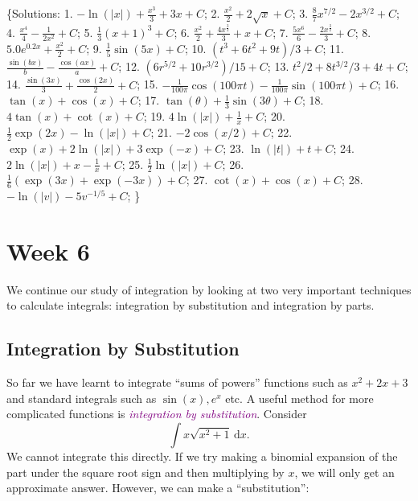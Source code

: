 \documentclass[
  english,
  11pt,
  oneside]{book}
\newcommand{\slide}{}
\theoremstyle{definition}
\theoremstyle{definition}
\theoremstyle{definition}
\theoremstyle{definition}
\theoremstyle{remark}
\begin{document}
\{Solutions:
1. \(-\ln(|x|)+{\frac{x^3}{3}}+3x+C\);
2. \({\frac{x^2}{2}}+2\sqrt{x}+C\);
3. \(\frac{8}{7}x^{7/2} - 2x^{3/2}+C\);
4. \({\frac{x^4}{4}}-{\frac{1}{2x^2}}+C\);
5. \(\frac{1}{3}(x+1)^3+C\);
6. \({\frac{x^2}{2}}+\frac{4x^{\frac{3}{2}}}{3}+x+C\);
7. \({\frac{5x^6}{6}}-\frac{2x^{\frac{3}{2}}}{3}+C\);
8. \(5.0e^{0.2x}+\frac{x^2}{2}+C\);
9. \(\frac{1}{5}\sin(5x)+C\);
10. \((t^3+6t^2+9t)/3+C\);
11. \(\frac{\sin(bx)}{b}-\frac{\cos(ax)}{a}+C\);
12. \((6r^{5/2}+10r^{3/2})/15+C\);
13. \(t^2/2 + 8t^{3/2}/3+4t+C\);
14. \(\frac{\sin(3x)}{3}+\frac{\cos(2x)}{2}+C\);
15. \(-\frac{1}{100\pi}\cos(100\pi t) - \frac{1}{100\pi}\sin(100\pi t) + C\);
16. \(\tan(x)+\cos(x)+C\);
17. \(\tan(\theta) + \frac{1}{3}\sin(3\theta)+C\);
18. \(4\tan(x) + \cot(x) +C\);
19. \(4\ln(|x|) + \frac{1}{x} +C\);
20. \(\frac{1}{2}\exp(2x)-\ln(|x|) + C\);
21. \(-2\cos(x/2)+C\);
22. \(\exp(x) + 2\ln(|x|) +3\exp(-x)+C\);
23. \(\ln(|t|) + t + C\);
24. \(2\ln(|x|) + x - \frac{1}{x} + C\);
25. \(\frac{1}{2}\ln(|x|)+C\);
26. \(\frac{1}{6}(\exp(3x)+\exp(-3x)) + C\);
27. \(\cot(x)+\cos(x)+C\);
28. \(-\ln(|v|)-5 v^{-1/5}+C\);
\}

\chapter{Week 6}\label{week-six}

We continue our study of integration by looking at two very important techniques to calculate integrals: integration by substitution and integration by parts.

\slide

\section{Integration by Substitution}\label{integration-by-substitution}

So far we have learnt to integrate ``sums of powers'' functions such as \(x^2 + 2x + 3\) and standard integrals such as \(\sin(x), e^x\) etc. A useful method for more complicated functions is \textcolor{purple}{\em integration by substitution}. Consider
\begin{equation}
\int x\sqrt{x^2+1} \,\mathrm{d}x.
\label{eq:6-1}
\end{equation}
We cannot integrate this directly. If we try making a binomial expansion of the part under the square root sign and then multiplying by \(x\), we will only get an approximate answer. However, we can make a ``substitution'':
\end{document}
